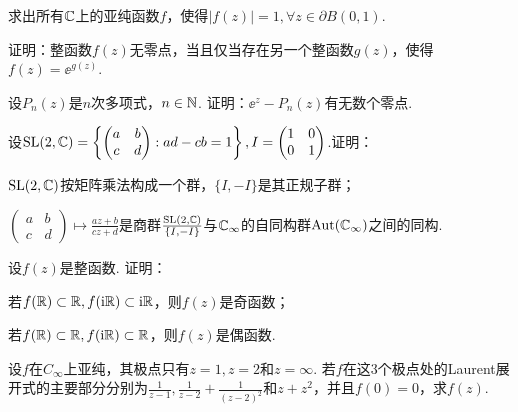 \begin{xiti}
  \item 求出所有$\mathbb C$上的亚纯函数$f$，使得$|f(z)|=1,\forall z\in \partial B(0,1)$.
  \item 证明：整函数$f(z)$无零点，当且仅当存在另一个整函数$g(z)$，使得$f(z)=\ee^{g(z)}$.
  \item 设$P_n(z)$是$n$次多项式，$n\in\mathbb N$. 证明：$\ee^z-P_n(z)$有无数个零点.
  \item 设$\operatorname{SL}(2,\mathbb C)=\left\{\begin{pmatrix}
                           a & b \\ 
                           c & d
                           \end{pmatrix}:ad - cb = 1\right\}, 
                           I = \begin{pmatrix}
                           1 & 0 \\ 
                           0 & 1
                           \end{pmatrix}$.证明：
    \begin{enuma}
      \item $\operatorname{SL}(2,\mathbb C)$按矩阵乘法构成一个群，$\{ I,- I\}$是其正规子群；
      \item $\begin{pmatrix}
        a & b \\ 
        c & d
       \end{pmatrix}\mapsto\frac{az+b}{cz+d}$是商群$\frac{\operatorname{SL}(2,\mathbb C)}{\{ I,- I\}}$与$\mathbb C_\infty$的自同构群$\operatorname{Aut}(\mathbb C_\infty)$之间的同构.
    \end{enuma}
  \item 设$f(z)$是整函数. 证明：
    \begin{enuma}
      \item 若$f(\mathbb R)\subset \mathbb R,f(\mathrm i\mathbb R)\subset \mathrm i\mathbb R$，则$f(z)$是奇函数；
      \item 若$f(\mathbb R)\subset \mathbb R,f(\mathrm i\mathbb R)\subset \mathbb R$，则$f(z)$是偶函数.
    \end{enuma}
  \item 设$f$在$C_\infty$上亚纯，其极点只有$z=1,z=2$和$z=\infty$. 若$f$在这$3$个极点处的Laurent展开式的主要部分分别为$\frac1{z-1},\frac1{z-2}+\frac1{(z-2)^2}$和$z+z^2$，并且$f(0)=0$，求$f(z)$.
\end{xiti}

